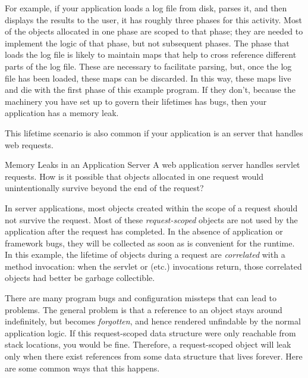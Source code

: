 For example, if your application loads a log file from disk,
parses it, and then displays the results to the user, it has roughly three
phases for this activity. Most of the objects allocated in one phase are scoped to that
phase; they are needed to implement the logic of that phase, but not subsequent
phases. The phase that loads the log file is likely to maintain maps that
help to cross reference different parts of the log file. These are necessary
to facilitate parsing, but, once the log file has been loaded, these maps can be
discarded. In this way, these maps live and die with the first phase of this
example program. If they don't, because the machinery you have set up to
govern their lifetimes has bugs, then your application has a memory
leak.

This lifetime scenario is also common if your application is an
server that handles web requests.

\begin{example}{Memory Leaks in an Application Server}
	A web application server handles servlet requests. How is it possible that
	objects allocated in one request would unintentionally survive beyond the end
	of the request?
\end{example} 
  
In server applications, most
objects created within the scope of a request should not survive the
request. Most of these \emph{request-scoped}
 objects are not used by the application after the
request has completed. In the absence of application or framework bugs, they will
be collected as soon as is convenient for the runtime. In this example, the
lifetime of objects during a request are \emph{correlated} with a method
invocation: when the servlet  or  (etc.) invocations
return, those correlated objects had better be garbage collectible.

There are many program bugs and configuration missteps that can lead to
problems. The general problem is that a reference to an object stays around
indefinitely, but becomes
\emph{forgotten}, and hence rendered unfindable by the normal application
logic. If this request-scoped data structure were only reachable from stack
locations, you would be fine. Therefore, a request-scoped object will leak only
when there exist references from some data structure that lives forever. Here
are some common ways that this happens.

